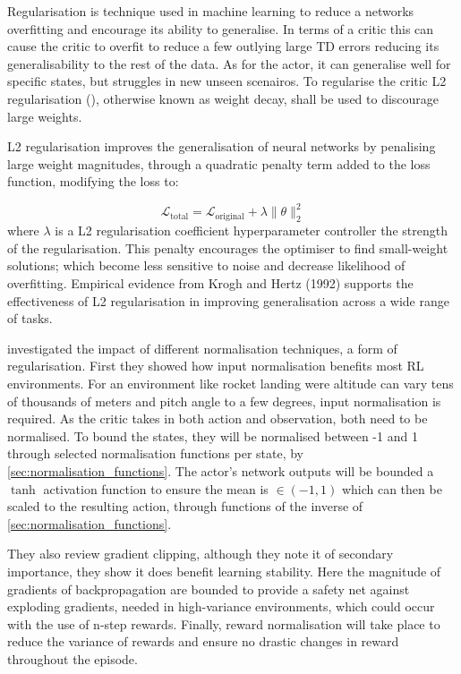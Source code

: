 Regularisation is technique used in machine learning to reduce a networks overfitting and encourage its ability to generalise. In terms of a critic this can cause the critic to overfit to reduce a few outlying large TD errors reducing its generalisability to the rest of the data. As for the actor, it can generalise well for specific states, but struggles in new unseen scenairos. To regularise the critic L2 regularisation (\cite{krogh1992weightdecay}), otherwise known as weight decay, shall be used to discourage large weights.

\begin{tcolorbox}[title={\textbf{Lemma. L2 regularisation (weight decay)}}]
L2 regularisation improves the generalisation of neural networks by penalising large weight magnitudes, through a quadratic penalty term added to the loss function, modifying the loss to:

\[
\mathcal{L}_{\text{total}} = \mathcal{L}_{\text{original}} + \lambda \lVert \theta \rVert_2^2
\]
where \( \lambda \) is a L2 regularisation coefficient hyperparameter controller the strength of the regularisation. This penalty encourages the optimiser to find small-weight solutions; which become less sensitive to noise and decrease likelihood of overfitting. Empirical evidence from Krogh and Hertz (1992) supports the effectiveness of L2 regularisation in improving generalisation across a wide range of tasks.
\end{tcolorbox}

\cite{andrychowicz2020matters} investigated the impact of different normalisation techniques, a form of regularisation. First they showed how input normalisation benefits most RL environments. For an environment like rocket landing were altitude can vary tens of thousands of meters and pitch angle to a few degrees, input normalisation is required. As the critic takes in both action and observation, both need to be normalised. To bound the states, they will be normalised between -1 and 1 through selected normalisation functions per state, by \autoref{sec:normalisation_functions}. The actor's network outputs will be bounded a $\tanh$ activation function to ensure the mean is $\in (-1,1)$ which can then be scaled to the resulting action, through functions of the inverse of \autoref{sec:normalisation_functions}.

They also review gradient clipping, although they note it of secondary importance, they show it does benefit learning stability. Here the magnitude of gradients of backpropagation are bounded 
to provide a safety net against exploding gradients, needed in high-variance environments, which could occur with the use of n-step rewards. Finally, reward normalisation will take place to reduce the variance of rewards and ensure no drastic changes in reward throughout the episode.

